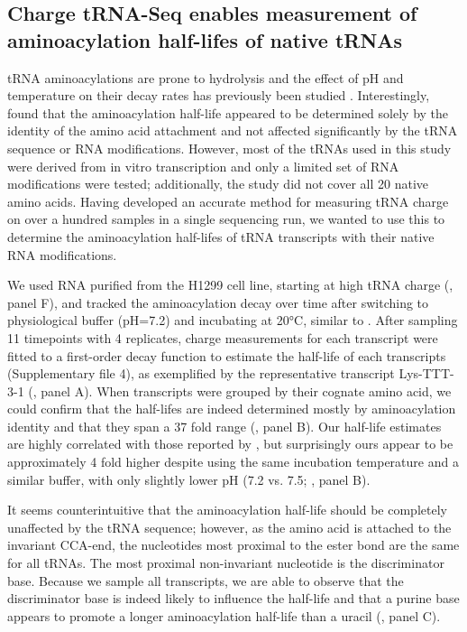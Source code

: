 \documentclass[9pt,lineno]{elife}
\begin{document}
\subsection{Charge tRNA-Seq enables measurement of aminoacylation half-lifes of native tRNAs}
tRNA aminoacylations are prone to hydrolysis and the effect of pH and temperature on their decay rates has previously been studied \citep{Hentzen1972-yd}.
Interestingly, \cite{Peacock2014-wk} found that the aminoacylation half-life appeared to be determined solely by the identity of the amino acid attachment and not affected significantly by the tRNA sequence or RNA modifications.
However, most of the tRNAs used in this study were derived from in vitro transcription and only a limited set of RNA modifications were tested; additionally, the study did not cover all 20 native amino acids.
Having developed an accurate method for measuring tRNA charge on over a hundred samples in a single sequencing run, we wanted to use this to determine the aminoacylation half-lifes of tRNA transcripts with their native RNA modifications.

We used RNA purified from the H1299 cell line, starting at high tRNA charge (, panel F), and tracked the aminoacylation decay over time after switching to physiological buffer (pH=7.2) and incubating at 20°C, similar to \cite{Peacock2014-wk}.
After sampling 11 timepoints with 4 replicates, charge measurements for each transcript were fitted to a first-order decay function to estimate the half-life of each transcripts (Supplementary file 4), as exemplified by the representative transcript Lys-TTT-3-1 (, panel A).
When transcripts were grouped by their cognate amino acid, we could confirm that the half-lifes are indeed determined mostly by aminoacylation identity and that they span a 37 fold range (, panel B).
Our half-life estimates are highly correlated with those reported by \cite{Peacock2014-wk}, but surprisingly ours appear to be approximately 4 fold higher despite using the same incubation temperature and a similar buffer, with only slightly lower pH (7.2 vs. 7.5; , panel B).

It seems counterintuitive that the aminoacylation half-life should be completely unaffected by the tRNA sequence; however, as the amino acid is attached to the invariant CCA-end, the nucleotides most proximal to the ester bond are the same for all tRNAs.
The most proximal non-invariant nucleotide is the discriminator base.
Because we sample all transcripts, we are able to observe that the discriminator base is indeed likely to influence the half-life and that a purine base appears to promote a longer aminoacylation half-life than a uracil (, panel C).
\end{document}
